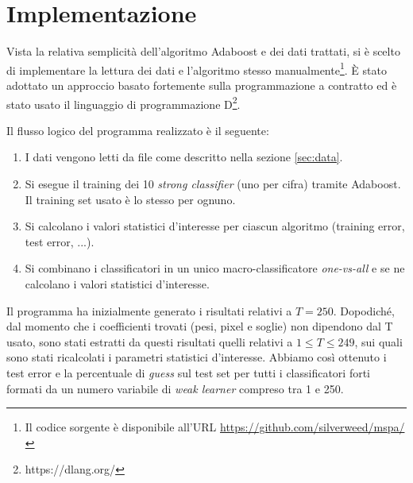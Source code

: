 

\section{Implementazione}
Vista la relativa semplicit\`a dell'algoritmo Adaboost e dei dati trattati, si \`e scelto di implementare la lettura dei dati e l'algoritmo stesso manualmente\footnote{Il codice sorgente \`e disponibile all'URL \url{https://github.com/silverweed/mspa/}}. \`E stato adottato un approccio basato fortemente sulla programmazione a contratto ed \`e stato usato il linguaggio di programmazione D\footnote{https://dlang.org/}.

Il flusso logico del programma realizzato \`e il seguente:
\begin{enumerate}
\item I dati vengono letti da file come descritto nella sezione \ref{sec:data}.
\item Si esegue il training dei 10 {\it strong classifier} (uno per cifra) tramite Adaboost. Il training set usato \`e lo stesso per ognuno.
\item Si calcolano i valori statistici d'interesse per ciascun algoritmo (training error, test error, ...).
\item Si combinano i classificatori in un unico macro-classificatore {\it one-vs-all} e se ne calcolano i valori statistici d'interesse.
\end{enumerate}

Il programma ha inizialmente generato i risultati relativi a \(T = 250\). Dopodich\'e, dal momento che i coefficienti trovati (pesi, pixel e soglie) non dipendono dal T usato, sono stati estratti da questi risultati quelli relativi a \(1 \le T \le 249\), sui quali sono stati ricalcolati i parametri statistici d'interesse. Abbiamo cos\`i ottenuto i test error e la percentuale di {\it guess} sul test set per tutti i classificatori forti formati da un numero variabile di {\it weak learner} compreso tra 1 e 250.
